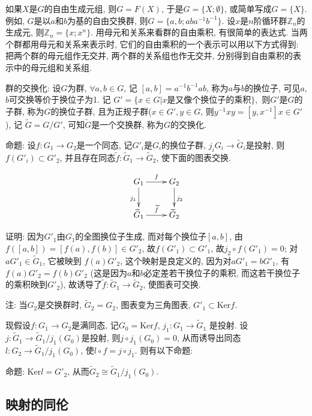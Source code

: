 \documentclass{ctexart}%
\theoremstyle{definition}
\theoremstyle{remark}
\begin{document}
 如果$X$是$G$的自由生成元组, 则$G=F(X)$, 于是$G=\{X;\emptyset\}$, 或简单写成$G=\{X\}$. 例如, $G$是以$a$和$b$为基的自由交换群, 则$G=\{a,b; aba^{-1}b^{-1}\}$. 设$x$是$n$阶循环群$\mathbb{Z}_n$的生成元, 则$\mathbb{Z}_n = \{x; x^n\}$. 用母元和关系来看群的自由乘积, 有很简单的表达式. 当两个群都用母元和关系来表示时, 它们的自由乘积的一个表示可以用以下方式得到: 把两个群的母元组作无交并, 两个群的关系组也作无交并, 分别得到自由乘积的表示中的母元组和关系组. 
 
群的交换化: 设$G$为群, $\forall a,b\in G$, 记 $[a,b]=a^{-1}b^{-1}ab$, 称为$a$与$b$的换位子, 可见$a$,$b$可交换等价于换位子为1. 记
$G'=\{x\in G|x\text{是又像个换位子的乘积}\},$
则$G'$是$G$的子群, 称为$G$的换位子群, 且为正规子群($x\in G', y\in G$, 则$y^{-1}xy=[y,x^{-1}]x\in G'$), 记
$\widetilde{G} = G/G'$, 可知$\widetilde{G}$是一个交换群, 称为$G$的交换化.  

命题: 设$f :G_1\rightarrow G_2$是一个同态, 记$G'_i$是$G_i$的换位子群, $j_i G_i\rightarrow \widetilde{G}_i$是投射, 则$f(G'_i)\subset G'_2$, 并且存在同态$\widetilde{f}: \widetilde{G}_1 \rightarrow \widetilde{G}_2$, 使下面的图表交换. 

\begin{displaymath}
    \xymatrix{
        G_1 \ar[r]^f \ar[d]_{j_1} & G_2 \ar[d]^{j_2} \\
        \widetilde{G}_1 \ar[r]^{\widetilde{f}}       & \widetilde{G}_2 }
\end{displaymath}

证明: 因为$G'_1$由$G_1$的全图换位子生成, 而对每个换位子$[a,b]$, 由$f([a,b])=[f(a),f(b)]\in G'_2$, 故$f(G'_1)\subset G'_1$, 故$j_2\circ f(G'_1)=0$; 对 $aG'_1 \in \widetilde{G}_1$, 它被映到 $f(a)G'_2$, 这个映射是良定义的, 因为对$aG'_1=bG'_1$, 有$f(a)G'_2=f(b)G'_2$ (这是因为$a$和$b$必定差若干换位子的乘积, 而这若干换位子的乘积映到$G'_2$), 故诱导了$\widetilde{f}: \widetilde{G}_1\rightarrow \widetilde{G}_2$, 使图表可交换. 
 
 注: 当$G_2$是交换群时, $\widetilde{G}_2=G_2$, 图表变为三角图表, $G'_1\subset \text{Ker} f$. 
 
 现假设$f: G_1\rightarrow G_2$是满同态, 记$G_0 = \text{Ker} f$, $j_1: G_1\rightarrow \widetilde{G}_1$ 是投射. 设$j: \widetilde{G}_1\rightarrow \widetilde{G}_1 /j_1 (G_0)$是投射, 则$j\circ j_1 (G_0)=0$, 从而诱导出同态$l: G_2 \rightarrow \widetilde{G}_1/j_1(G_0)$, 使$l\circ f = j\circ j_1$. 则有以下命题:
 
命题: $\text{Ker}l=G'_2$, 从而$\widetilde{G}_2 \cong \widetilde{G}_1/j_1(G_0)$. 

\subsection{映射的同伦}
\end{document}
